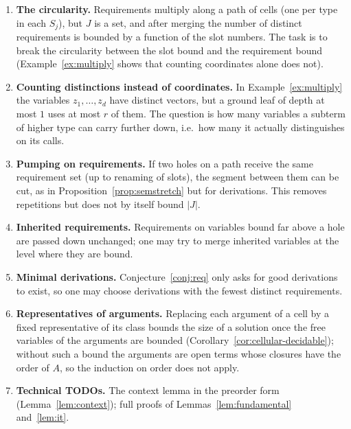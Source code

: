 \documentclass[11pt]{article}
\theoremstyle{definition}
\begin{document}
\begin{enumerate}
\item \textbf{The circularity.}  Requirements multiply along a path of
  cells (one per type in each $S_j$), but $J$ is a set, and after merging
  the number of distinct requirements is bounded by a function of the slot
  numbers.  The task is to break the circularity between the slot bound
  and the requirement bound (Example~\ref{ex:multiply} shows that counting
  coordinates alone does not).
\item \textbf{Counting distinctions instead of coordinates.}  In
  Example~\ref{ex:multiply} the variables $z_1,\ldots,z_d$ have distinct
  vectors, but a ground leaf of depth at most $1$ uses at most $r$ of them.
  The question is how many variables a subterm of higher type can carry
  further down, i.e.\ how many it actually distinguishes on its calls.
\item \textbf{Pumping on requirements.}  If two holes on a path receive the
  same requirement set (up to renaming of slots), the segment between them
  can be cut, as in Proposition~\ref{prop:semstretch} but for derivations.
  This removes repetitions but does not by itself bound $|J|$.
\item \textbf{Inherited requirements.}  Requirements on variables bound
  far above a hole are passed down unchanged; one may try to merge
  inherited variables at the level where they are bound.
\item \textbf{Minimal derivations.}  Conjecture~\ref{conj:req} only asks
  for good derivations to exist, so one may choose derivations with the
  fewest distinct requirements.
\item \textbf{Representatives of arguments.}  Replacing each argument of a
  cell by a fixed representative of its class bounds the size of a
  solution once the free variables of the arguments are bounded
  (Corollary~\ref{cor:cellular-decidable}); without such a bound the
  arguments are open terms whose closures have the order of $A$, so the
  induction on order does not apply.
\item \textbf{Technical TODOs.}  The context lemma in the preorder form
  (Lemma~\ref{lem:context}); full proofs of Lemmas~\ref{lem:fundamental}
  and~\ref{lem:it}.
\end{enumerate}
\end{document}
